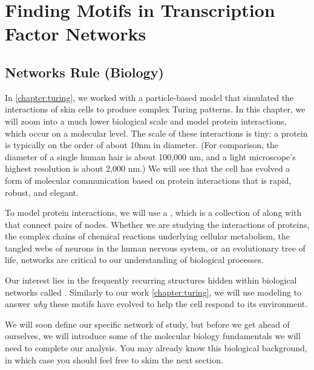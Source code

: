 \chapter[Finding Motifs in Transcription Factor Networks]{Finding Motifs in Transcription Factor Networks}
\label{chapter:motifs}
\renewcommand{\chaptertitle}{Finding Motifs in Transcription Factor Networks}


\FloatBarrier

\section{Networks Rule (Biology)}
\label{sec:introduction}

In \autoref{chapter:turing}, we worked with a particle-based model that simulated the interactions of skin cells to produce complex Turing patterns. In this chapter, we will zoom into a much lower biological scale and model protein interactions, which occur on a molecular level. The scale of these interactions is tiny: a protein is typically on the order of about 10nm in diameter. (For comparison, the diameter of a single human hair is about 100,000 nm, and a light microscope's highest resolution is about 2,000 nm.) We will see that the cell has evolved a form of molecular communication based on protein interactions that is rapid, robust, and elegant.

To model protein interactions, we will use a  , which is a collection of  along with  that connect pairs of nodes. Whether we are studying the interactions of proteins, the complex chains of chemical reactions underlying cellular metabolism, the tangled webs of neurons in the human nervous system, or an evolutionary tree of life, networks are critical to our understanding of biological processes.

Our interest lies in the frequently recurring structures hidden within biological networks called . Similarly to our work \autoref{chapter:turing}, we will use modeling to answer \textit{why} these motifs have evolved to help the cell respond to its environment.

We will soon define our specific network of study, but before we get ahead of ourselves, we will introduce some of the molecular biology fundamentals we will need to complete our analysis. You may already know this biological background, in which case you should feel free to skim the next section.\\

